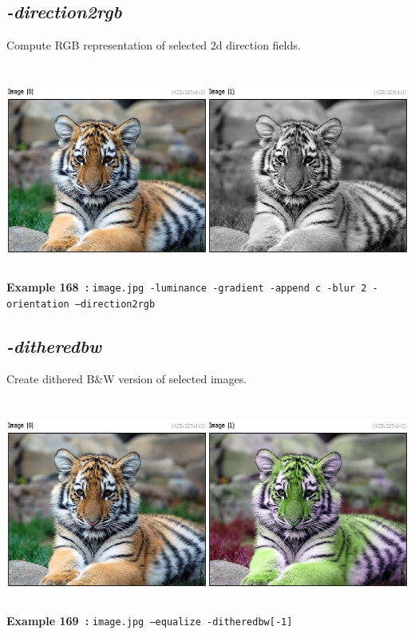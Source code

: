 \documentclass[a4paper,11pt,twoside]{book}
\begin{document}
\subsection{\emph{-direction2rgb} }\vspace*{-0.5em}
Compute RGB representation of selected 2d direction fields.
\begin{center}\includegraphics[keepaspectratio=true,height=7cm,width=\textwidth]{img/gmic_def168.jpg}\\
{\footnotesize \textbf{Example 168~:} \texttt{image.jpg -luminance -gradient -append c -blur 2 -orientation --direction2rgb}}
\end{center}

\subsection{\emph{-ditheredbw} }\vspace*{-0.5em}
Create dithered B\&W version of selected images.
\begin{center}\includegraphics[keepaspectratio=true,height=7cm,width=\textwidth]{img/gmic_def169.jpg}\\
{\footnotesize \textbf{Example 169~:} \texttt{image.jpg --equalize -ditheredbw[-1]}}
\end{center}
\end{document}
